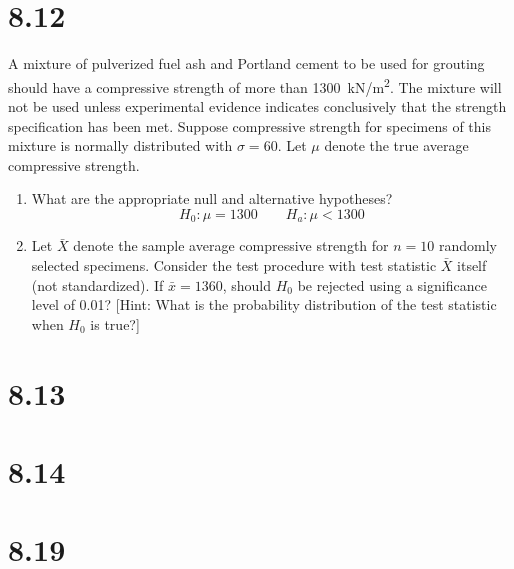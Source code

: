 \documentclass[letterpaper,12pt,fleqn]{article}
\newcommand{\m}{\mu}
\renewcommand{\o}{\sigma}
\begin{document}
\section*{8.12}

A mixture of pulverized fuel ash and Portland cement to be used for grouting should have a compressive strength of more than
\SI{1300}{kN/m^2}.  The mixture will not be used unless experimental evidence indicates conclusively that the strength
specification has been met.  Suppose compressive strength for specimens of this mixture is normally distributed with
\(\o=60\).  Let \(\m\) denote the true average compressive strength.
\begin{enumerate}[label={\alph*)}]
\item What are the appropriate null and alternative hypotheses?
  \[H_0:\m=1300\qquad H_a:\m<1300\]
\item Let \(\bar{X}\) denote the sample average compressive strength for \(n=10\) randomly selected specimens.  Consider the
  test procedure with test statistic \(\bar{X}\) itself (not standardized).  If \(\bar{x}=1360\), should \(H_0\) be
  rejected using a significance level of 0.01?  [Hint: What is the probability distribution of the test statistic when
    \(H_0\) is true?]
\end{enumerate}

\section*{8.13}

\section*{8.14}

\section*{8.19}
\end{document}
